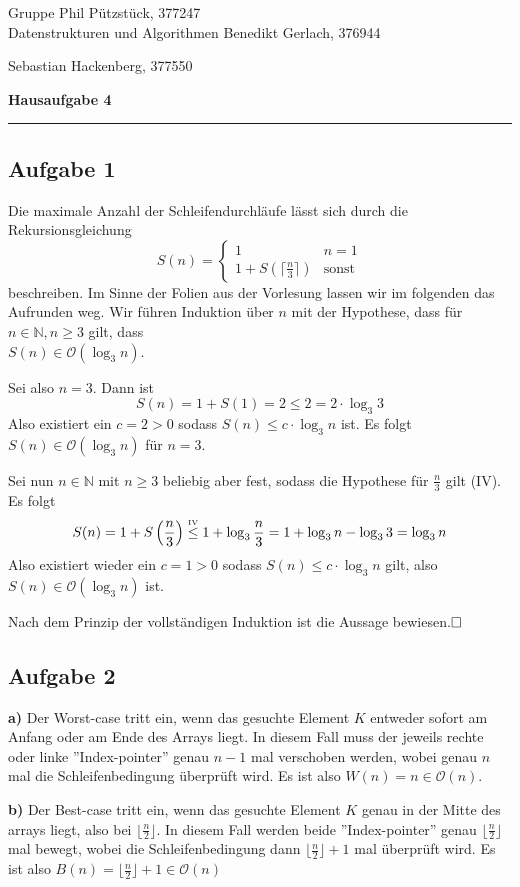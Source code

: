 \documentclass[a4paper,graphics,11pt]{article}
\newcommand{\aufgabe}[1]{\subsection*{Aufgabe #1}}
\newcommand{\up}[2]{\mathrel{\overset{\makebox[0pt]{\mbox{\normalfont\tiny #2}}}{#1}}}
\begin{document}
\noindent Gruppe              \hfill Phil Pützstück, 377247\\
\noindent Datenstrukturen und Algorithmen \hfill Benedikt Gerlach, 376944\\
\strut\hfill Sebastian Hackenberg, 377550\\
\begin{center}
	\LARGE{\textbf{Hausaufgabe 4}}
\end{center}
\begin{center}
\rule[0.1ex]{\textwidth}{1pt}
\end{center}

\aufgabe{1}
Die maximale Anzahl der Schleifendurchläufe lässt sich durch die Rekursionsgleichung
$$
    S(n) = \begin{cases}
        1 & n = 1\\
        1 + S(\lceil\frac{n}{3}\rceil) & \text{sonst}
    \end{cases}
$$
beschreiben. Im Sinne der Folien aus der Vorlesung lassen wir im folgenden das Aufrunden weg.
Wir führen Induktion über $n$ mit der Hypothese,
dass für $n \in \mathbb{N}, n\geq 3$ gilt, dass\\
$S(n) \in \mathcal{O}(\log_3n)$.

Sei also $n = 3$. Dann ist
$$
    S(n) = 1+S(1) = 2 \leq 2 = 2\cdot \log_3 3
$$
Also existiert ein $c = 2 > 0$ sodass $S(n) \leq c \cdot \log_3n$ ist. Es folgt
$S(n) \in \mathcal{O}(\log_3n)$ für $n = 3$.

Sei nun $n \in \mathbb{N}$ mit $n \geq 3$ beliebig aber fest, sodass die Hypothese für
$\frac{n}{3}$ gilt (IV).
Es folgt
$$
    S(n)
    = 1 + S\left(\frac{n}{3}\right) \up{\leq}{IV} 1 + \log_3\frac{n}{3}
    = 1 + \log_3 n - \log_33
    = \log_3 n
$$
Also existiert wieder ein $c = 1 > 0$ sodass $S(n) \leq c \cdot \log_3n$ gilt, also
$S(n) \in \mathcal{O}(\log_3n)$ ist.

Nach dem Prinzip der vollständigen Induktion ist die Aussage bewiesen.$\hfill\square$
\aufgabe{2}
\textbf{a)}
Der Worst-case tritt ein, wenn das gesuchte Element $K$ entweder sofort am Anfang oder am Ende des
Arrays liegt. In diesem Fall muss der jeweils rechte oder linke ''Index-pointer'' genau $n-1$
mal verschoben werden, wobei genau $n$ mal die Schleifenbedingung überprüft wird.
Es ist also $W(n) = n\in \mathcal{O}(n)$.

\textbf{b)}
Der Best-case tritt ein, wenn das gesuchte Element $K$ genau in der Mitte des arrays liegt, also
bei $\lfloor\frac{n}{2}\rfloor$. In diesem Fall werden beide
''Index-pointer'' genau $\lfloor\frac{n}{2}\rfloor$ mal bewegt, wobei die Schleifenbedingung
dann $\lfloor\frac{n}{2}\rfloor + 1$ mal überprüft wird.
Es ist also $B(n) = \lfloor\frac{n}{2}\rfloor + 1 \in \mathcal{O}(n)$
\end{document}
